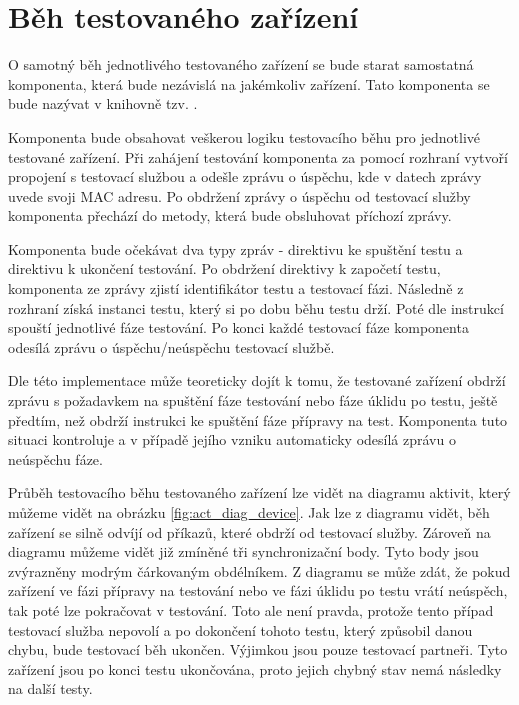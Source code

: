 \section{Běh testovaného zařízení}

O samotný běh jednotlivého testovaného zařízení se bude starat samostatná komponenta, která bude nezávislá na jakémkoliv zařízení. Tato komponenta se bude nazývat v knihovně tzv. .

Komponenta bude obsahovat veškerou logiku testovacího běhu pro jednotlivé testované zařízení. Při zahájení testování komponenta za pomocí rozhraní vytvoří propojení s testovací službou a odešle zprávu o úspěchu, kde v datech zprávy uvede svoji MAC adresu. Po obdržení zprávy o úspěchu od testovací služby komponenta přechází do metody, která bude obsluhovat příchozí zprávy. 

Komponenta bude očekávat dva typy zpráv - direktivu ke spuštění testu a direktivu k ukončení testování. Po obdržení direktivy k započetí testu, komponenta ze zprávy zjistí identifikátor testu a testovací fázi. Následně z rozhraní získá instanci testu, který si po dobu běhu testu drží. Poté dle instrukcí spouští jednotlivé fáze testování. Po konci každé testovací fáze komponenta odesílá zprávu o úspěchu/neúspěchu testovací službě.

Dle této implementace může teoreticky dojít k tomu, že testované zařízení obdrží zprávu s požadavkem na spuštění fáze testování nebo fáze úklidu po testu, ještě předtím, než obdrží instrukci ke spuštění fáze přípravy na test. Komponenta tuto situaci kontroluje a v případě jejího vzniku automaticky odesílá zprávu o neúspěchu fáze. 

Průběh testovacího běhu testovaného zařízení lze vidět na diagramu aktivit, který můžeme vidět na obrázku \ref{fig:act_diag_device}. Jak lze z diagramu vidět, běh zařízení se silně odvíjí od příkazů, které obdrží od testovací služby. Zároveň na diagramu můžeme vidět již zmíněné tři synchronizační body. Tyto body jsou zvýrazněny modrým čárkovaným obdélníkem. Z diagramu se může zdát, že pokud zařízení ve fázi přípravy na testování nebo ve fázi úklidu po testu vrátí neúspěch, tak poté lze pokračovat v testování. Toto ale není pravda, protože tento případ testovací služba nepovolí a po dokončení tohoto testu, který způsobil danou chybu, bude testovací běh ukončen. Výjimkou jsou pouze testovací partneři. Tyto zařízení jsou po konci testu ukončována, proto jejich chybný stav nemá následky na další testy.

